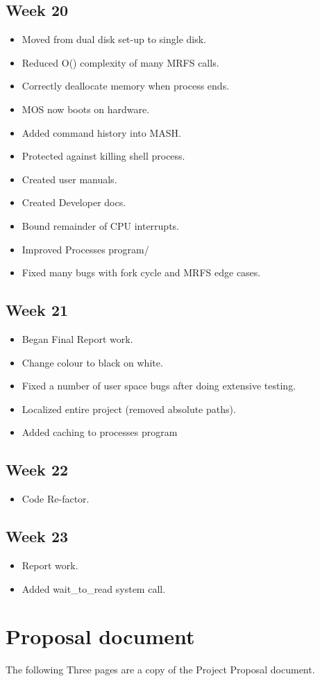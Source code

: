 \documentclass[a4paper]{report}
\begin{document}
\subsection*{Week 20}
\begin{itemize}
\item Moved from dual disk set-up to single disk.
\item Reduced O() complexity of many MRFS calls.
\item Correctly deallocate memory when process ends.
\item MOS now boots on hardware.
\item Added command history into MASH.
\item Protected against killing shell process.
\item Created user manuals.
\item Created Developer docs.
\item Bound remainder of CPU interrupts.
\item Improved Processes program/
\item Fixed many bugs with fork cycle and MRFS edge cases.
\end{itemize}

\subsection*{Week 21}
\begin{itemize}
\item Began Final Report work.
\item Change colour to black on white.
\item Fixed a number of user space bugs after doing extensive testing.
\item Localized entire project (removed absolute paths).
\item Added caching to processes program
\end{itemize}

\subsection*{Week 22}
\begin{itemize}
\item Code Re-factor.
\end{itemize}

\subsection*{Week 23}
\begin{itemize}
\item Report work.
\item Added wait\_to\_read system call.
\end{itemize}
\clearpage

\section{Proposal document}

The following Three pages are a copy of the Project Proposal document.








\end{document}
